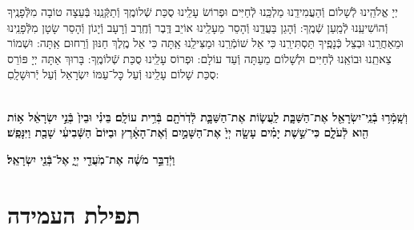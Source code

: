 \documentclass[twoside, openany, parskip=half, 11pt]{book}
\begin{document}
\hamaarivaravim

\ahavasolam

\shema

\veahavta

\vehaya

\vayomer{}

\emesveemuna

יְיָ אֱלֹהֵֽינוּ לְֿשָׁלוֹם וְֿהַעֲמִידֵֽנוּ מַלְכֵּֽנוּ לְֿחַיִּים וּפְרוֹשׂ עָלֵֽינוּ סֻכַּת שְֿׁלוֹמֶֽךָ וְֿתַקְּֿנֵֽנוּ בְּֿעֵצָה טוֹבָה מִלְּֿפָנֶֽיךָ וְֿהוֹשִׁיעֵֽנוּ לְֿמַֽעַן שְֿׁמֶֽךָ: וְֿהָגֵן בַּעֲדֵֽנוּ וְֿהָסֵר מֵעָלֵֽינוּ אוֹיֵב דֶּֽבֶר וְֿחֶֽרֶב וְֿרָעָב וְֿיָגוֹן וְֿהָסֵר שָׂטָן מִלְּֿפָנֵֽינוּ וּמֵאַחֲרֵֽנוּ וּבְצֵל כְּֿנָפֶֽיךָ תַּסְתִּירֵֽנוּ כִּי אֵל שׁוֹמְֿרֵֽנוּ וּמַצִּילֵֽנוּ אַֽתָּה כִּי אֵל מֶֽלֶךְ חַנּוּן וְֿרַחוּם אַֽתָּה:  וּשְׁמוֹר צֵאתֵֽנוּ וּבוֹאֵֽנוּ לְֿחַיִּים וּלְשָׁלוֹם מֵעַתָּה וְֿעַד עוֹלָם: וּפְרוֹס עָלֵֽינוּ סֻכַּת שְֿׁלוֹמֶֽךָ: בָּרוּךְ אַתָּה יְיָ פּוֹרֵס סֻכַּת שָׁלוֹם עָלֵֽינוּ וְֿעַל כׇּל־עַמּוֹ יִשְׂרָאֵל וְֿעַל יְֿרוּשָׁלָֽםִ:

\\
\textbf{וְשָֽׁמְֿר֥וּ בְֿנֵֽי־יִשְׂרָאֵ֖ל אֶת־הַשַּׁבָּ֑ת
לַֽעֲשׂ֧וֹת אֶת־הַשַּׁבָּ֛ת לְֿדֹֽרֹתָ֖ם בְּֿרִ֥ית עוֹלָֽם׃ בֵּינִ֗י וּבֵין֙ בְּֿנֵ֣י יִשְׂרָאֵ֔ל א֥וֹת הִ֖וא לְֿעֹלָ֑ם כִּי־שֵׁ֣שֶׁת יָמִ֗ים עָשָׂ֤ה יְיָ֙
אֶת־הַשָּׁמַ֣יִם וְֿאֶת־הָאָ֔רֶץ וּבַיּוֹם֙ הַשְּֿׁבִיעִ֔י שָׁבַ֖ת וַיִּנָּפַֽשׁ׃
}

\textbf{
וַיְֿדַבֵּ֣ר מֹשֶׁ֔ה אֶת־מֹֽעֲדֵ֖י יְיָ֑ אֶל־בְּֿנֵ֖י יִשְׂרָאֵֽל׃
}



\halfkaddish


\section*{ תפילת העמידה }

\newcommand{\shabbosshuva}{בשבת שובה:}


\newcommand{\shabboskiddushhashem}{
\firstword{אַתָּה קָדוֹשׁ}
וְֿשִׁמְךָ קָדוֹשׁ וּקְדוֹשִׁים בְּֿכׇל־יוֹם יְֿהַלֲלוּךָ סֶּֽלָה: בָּרוּךְ אַתָּה יְיָ *הָאֵל
(*\instruction{בשבת שובה:}
הַמֶּֽלֶךְ)
הַקָּדוֹשׁ:
}


\newcommand{\shabboskiddushhayom}{
\firstword{אֱלֹהֵינוּ}
וֵאלֹהֵי אֲבוֹתֵינוּ רְֿצֵה בִמְנוּחָתֵנוּ קַדְּֿשֵׁנוּ בְּֿמִצְוֹתֶיךָ וְֿתֵן חֶלְקֵנוּ בְּֿתוֹרָתֶךָ שַׂבְּֿעֵנוּ מִטּוּבֶךָ וְֿשַׂמְּֿחֵנוּ בִּישׁוּעָתֶךָ וְֿטַהֵר לִבֵּנוּ לְֿעָבְֿדְּֿךָ בֶּאֱמֶת: וְֿהַנְחִילֵנוּ יְיָ אֱלֹהֵינוּ בְּֿאַהֲבָה וּבְרָצוֹן שַׁבַּת קָדְֿשֶׁךָ וְֿיִשְׂמְֿחוּ בְֿךָ יִשְׂרָאֵל אוֹהֲבֵי שְֿׁמֶֽךָ:
בָּרוּךְ אַתָּה יְיָ מְֿקַדֵּשׁ הַשַּׁבָּת:
}
\end{document}

